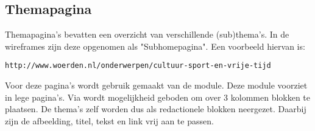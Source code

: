 \subsection{Themapagina}\label{themapagina}

Themapagina's bevatten een overzicht van verschillende (sub)thema's. In de wireframes zijn deze opgenomen als "Subhomepagina". Een voorbeeld hiervan is:
\begin{verbatim}
http://www.woerden.nl/onderwerpen/cultuur-sport-en-vrije-tijd
\end{verbatim}
Voor deze pagina's wordt gebruik gemaakt van de  module. Deze module voorziet in lege pagina's. Via  wordt mogelijkheid geboden om over 3 kolommen blokken te plaatsen. De thema's zelf worden dus als redactionele blokken neergezet. Daarbij zijn de afbeelding, titel, tekst en link vrij aan te passen.
